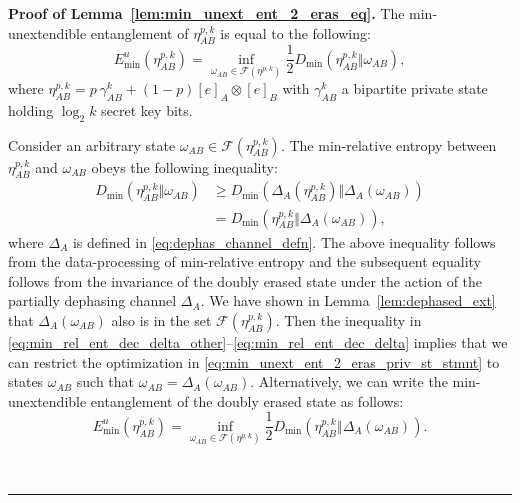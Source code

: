 \documentclass[twocolumn,letterpaper, dvipsnames,allowtoday, accepted = 2025-12-31]{quantumarticle}
\newenvironment{proof}[1][Proof]{\noindent\textbf{#1.} }{\ \rule{0.5em}{0.5em}}
\begin{document}
\begin{proof}[Proof of Lemma~\ref{lem:min_unext_ent_2_eras_eq}]
The min-unextendible entanglement of $\eta^{p,k}_{AB}$ is equal to the following:
\begin{equation}\label{eq:min_unext_ent_2_eras_priv_st_stmnt}
    E^u_{\min}\!\left(\eta^{p,k}_{AB}\right) =  \inf_{\omega_{AB} \in \mathcal{F}\left(\eta^{p,k}\right)}\frac{1}{2}D_{\min}\!\left(\eta^{p,k}_{AB}\Big\Vert\omega_{AB}\right),
\end{equation}
where $\eta^{p,k}_{AB} = p~\gamma^k_{AB} + (1-p)[e]_A\otimes[e]_B$ with $\gamma^k_{AB}$ a bipartite private state holding $\log_2 k$ secret key bits.

Consider an arbitrary state $\omega_{AB} \in \mathcal{F}\!\left(\eta^{p,k}_{AB}\right)$. The min-relative entropy between $\eta^{p,k}_{AB}$ and $\omega_{AB}$ obeys the following inequality:
\begin{align}
    D_{\min}\!\left(\eta^{p,k}_{AB}\Big\Vert\omega_{AB}\right) &\ge D_{\min}\!\left(\Delta_A\!\left(\eta^{p,k}_{AB}\right)\Big\Vert\Delta_A\!\left(\omega_{AB}\right)\right)
    \label{eq:min_rel_ent_dec_delta_other}\\
    &= D_{\min}\!\left(\eta^{p,k}_{AB}\Big\Vert\Delta_A\!\left(\omega_{AB}\right)\right),\label{eq:min_rel_ent_dec_delta}
\end{align}
where $\Delta_A$ is defined in \eqref{eq:dephas_channel_defn}. The above inequality follows from the data-processing of min-relative entropy and the subsequent equality follows from the invariance of the doubly erased state under the action of the partially dephasing channel $\Delta_A$. We have shown in Lemma~\ref{lem:dephased_ext} that $\Delta_A\!\left(\omega_{AB}\right)$ also is in the set $\mathcal{F}\!\left(\eta^{p,k}_{AB}\right)$. Then the inequality in \eqref{eq:min_rel_ent_dec_delta_other}--\eqref{eq:min_rel_ent_dec_delta} implies that we can restrict the optimization in \eqref{eq:min_unext_ent_2_eras_priv_st_stmnt} to states $\omega_{AB}$ such that $\omega_{AB} = \Delta_A\!\left(\omega_{AB}\right)$. Alternatively, we can write the min-unextendible entanglement of the doubly erased state as follows:
\begin{equation}
    E^u_{\min}\!\left(\eta^{p,k}_{AB}\right) =  \inf_{\omega_{AB} \in \mathcal{F}\left(\eta^{p,k}\right)}\frac{1}{2}D_{\min}\!\left(\eta^{p,k}_{AB}\Big\Vert\Delta_A\!\left(\omega_{AB}\right)\right).
\end{equation}


\end{proof}
\end{document}
